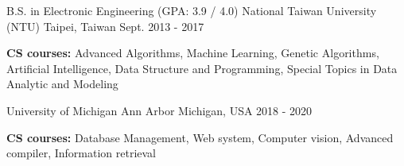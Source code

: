 \begin{cventries}
  \cventry
    {B.S. in Electronic Engineering (GPA: 3.9  /  4.0)}
    {National Taiwan University (NTU)}
    {Taipei, Taiwan }
    {Sept. 2013 - 2017}
    {
      \begin{cvitems}
        \item{\textbf{CS courses:} Advanced Algorithms, Machine Learning, Genetic Algorithms, Artificial Intelligence, Data Structure and Programming, Special Topics in Data Analytic and Modeling }
      \end{cvitems}
    }
    {University of Michigan Ann Arbor}
    {Michigan, USA}
    {2018 - 2020}
    {\begin{cvitems}
        \item{\textbf{CS courses:} Database Management, Web system, Computer vision, Advanced compiler, Information retrieval}
      \end{cvitems}}
\end{cventries}
